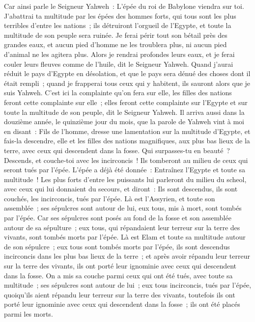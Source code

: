 \begin{multicols}{2}
Car ainsi parle le Seigneur Yahweh~: L'épée du roi de Babylone viendra sur toi.
J'abattrai ta multitude par les épées des hommes forts, qui tous sont les plus terribles d'entre les nations~; ils détruiront l'orgueil de l'Egypte, et toute la multitude de son peuple sera ruinée.
Je ferai périr tout son bétail près des grandes eaux, et aucun pied d'homme ne les troublera plus, ni aucun pied d'animal ne les agitera plus.
Alors je rendrai profondes leurs eaux, et je ferai couler leurs fleuves comme de l'huile, dit le Seigneur Yahweh.
Quand j'aurai réduit le pays d'Egypte en désolation, et que le pays sera dénué des choses dont il était rempli~; quand je frapperai tous ceux qui y habitent, ils sauront alors que je suis Yahweh.
C'est ici la complainte qu'on fera sur elle, les filles des nations feront cette complainte sur elle~; elles feront cette complainte sur l'Egypte et sur toute la multitude de son peuple, dit le Seigneur Yahweh.
Il arriva aussi dans la douzième année, le quinzième jour du mois, que la parole de Yahweh vint à moi en disant~:
Fils de l'homme, dresse une lamentation sur la multitude d'Egypte, et fais-la descendre, elle et les filles des nations magnifiques, aux plus bas lieux de la terre, avec ceux qui descendent dans la fosse.
Qui surpasses-tu en beauté~? Descends, et couche-toi avec les incirconcis~!
Ils tomberont au milieu de ceux qui seront tués par l'épée. L'épée a déjà été donnée~: Entraînez l'Egypte et toute sa multitude~!
Les plus forts d'entre les puissants lui parleront du milieu du scheol, avec ceux qui lui donnaient du secours, et diront~: Ils sont descendus, ils sont couchés, les incirconcis, tués par l'épée.
Là est l'Assyrien, et toute son assemblée~; ses sépulcres sont autour de lui, eux tous, mis à mort, sont tombés par l'épée.
Car ses sépulcres sont posés au fond de la fosse et son assemblée autour de sa sépulture~; eux tous, qui répandaient leur terreur sur la terre des vivants, sont tombés morts par l'épée.
Là est Elam et toute sa multitude autour de son sépulcre~; eux tous sont tombés morts par l'épée, ils sont descendus incirconcis dans les plus bas lieux de la terre~; et après avoir répandu leur terreur sur la terre des vivants, ils ont porté leur ignominie avec ceux qui descendent dans la fosse.
On a mis sa couche parmi ceux qui ont été tués, avec toute sa multitude~; ses sépulcres sont autour de lui~; eux tous incirconcis, tués par l'épée, quoiqu'ils aient répandu leur terreur sur la terre des vivants, toutefois ils ont porté leur ignominie avec ceux qui descendent dans la fosse~; ils ont été placés parmi les morts.

\end{multicols}
